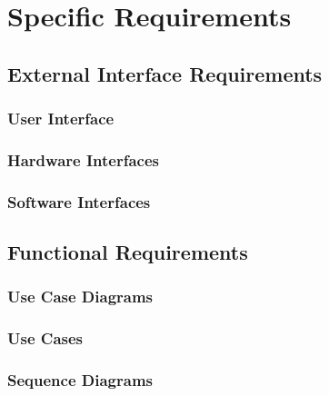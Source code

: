 \chapter{Specific Requirements}

\section{External Interface Requirements}
\subsection{User Interface}
\subsection{Hardware Interfaces}
\subsection{Software Interfaces}





\section{Functional Requirements}
\subsection{Use Case Diagrams}
\subsection{Use Cases}


\pagebreak

\subsection{Sequence Diagrams}


